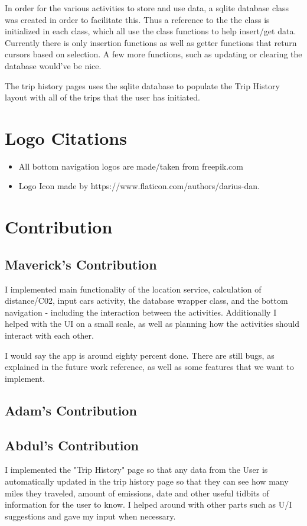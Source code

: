 \documentclass[twoside,twocolumn]{article}
\begin{document}
In order for the various activities to store and use data, a sqlite database class was created in order to facilitate this. Thus a reference to  the the class is initialized in each class, which all use the class functions to help insert/get data. Currently there is only insertion functions as well as getter functions that return cursors based on selection. A few more functions, such as updating or clearing the database would've be nice. 

The trip history pages uses the sqlite database to populate the Trip History layout with all of the trips that the user has initiated.


\section{Logo Citations}
\begin{itemize}
\item All bottom navigation logos are made/taken from freepik.com
\item Logo Icon made by https://www.flaticon.com/authors/darius-dan.
\end{itemize}

\section{Contribution}

\subsection{Maverick's Contribution}
I implemented main functionality of the location service, calculation of distance/C02, input cars activity, the database wrapper class, and the bottom navigation - including the interaction between the activities. Additionally I helped with the UI on a small scale, as well as planning how the activities should interact with each other.

I would say the app is around eighty percent done. There are still bugs, as explained in the future work reference, as well as some features that we want to implement. 

\subsection{Adam's Contribution}


\subsection{Abdul's Contribution}
I implemented the "Trip History" page so that any data from the User is automatically updated in the trip history page so that they can see how many miles they traveled, amount of emissions, date and other useful tidbits of information for the user to know. I helped around with other parts such as U/I suggestions and gave my input when necessary.
\end{document}
